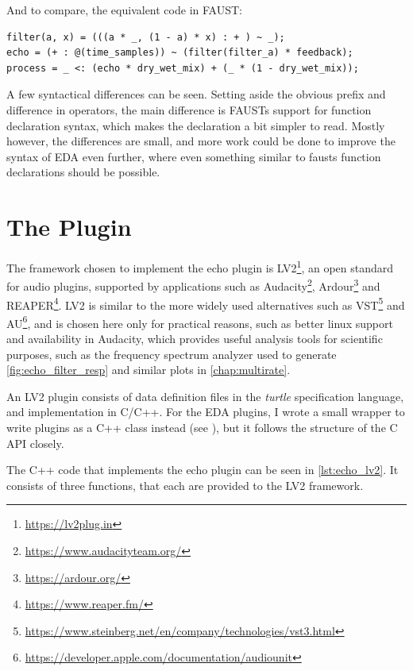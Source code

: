 And to compare, the equivalent code in FAUST:

\begin{verbatim}
filter(a, x) = (((a * _, (1 - a) * x) : + ) ~ _);
echo = (+ : @(time_samples)) ~ (filter(filter_a) * feedback);
process = _ <: (echo * dry_wet_mix) + (_ * (1 - dry_wet_mix));
\end{verbatim}

A few syntactical differences can be seen. Setting aside the obvious  prefix and
difference in operators, the main difference is FAUSTs support for function declaration syntax, which makes
the  declaration a bit simpler to read. Mostly however, the differences are small, and
more work could be done to improve the syntax of EDA even further, where even something similar to fausts
function declarations should be possible.

\section{The Plugin}
\label{sec:echo_plugin}

The framework chosen to implement the echo plugin is LV2\footnote{\url{https://lv2plug.in}}, an open standard for audio
plugins, supported by applications such as Audacity\footnote{\url{https://www.audacityteam.org/}}, Ardour\footnote{\url{https://ardour.org/}} and
REAPER\footnote{\url{https://www.reaper.fm/}}. LV2 is similar to the more widely used alternatives such as
VST\footnote{\url{https://www.steinberg.net/en/company/technologies/vst3.html}} and AU\footnote{\url{https://developer.apple.com/documentation/audiounit}}, and is chosen here only for practical reasons, such
as better linux support and availability in Audacity, which provides useful analysis tools for scientific
purposes, such as the frequency spectrum analyzer used to generate \autoref{fig:echo_filter_resp} and similar plots
in \autoref{chap:multirate}.

An LV2 plugin consists of data definition files in the \emph{turtle} specification language, and
implementation in C/C++. For the EDA plugins, I wrote a small wrapper to write plugins as a C++ class instead
(see ), but it follows the structure of the C API closely.

The C++ code that implements the echo plugin can be seen in \autoref{lst:echo_lv2}. It consists of three
functions, that each are provided to the LV2 framework.

